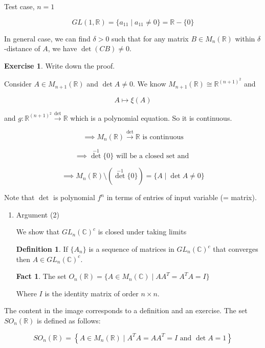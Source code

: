 \documentclass[11pt]{article}
\theoremstyle{definition}
\newtheorem{definition}{Definition}[section]
\newtheorem{fact}{Fact}
\newtheorem{exercise}{Exercise}
\theoremstyle{remark}
\begin{document}
Test case, $n=1$

\[
GL(1,\mathbb{R}) = \{a_{11} \mid a_{11} \neq 0\} = \mathbb{R} - \{0\}
\]

In general case, we can find $\delta > 0$ such that for any matrix $B \in M_n(\mathbb{R})$ within $\delta$-distance of $A$, we have $\det(CB) \neq 0$.

\begin{exercise}
Write down the proof.
\end{exercise}

Consider $A \in M_{n+1}(\mathbb{R})$ and $\det A \neq 0$. We know $M_{n+1}(\mathbb{R}) \cong \mathbb{R}^{(n+1)^2}$ and

\[
A \mapsto \xi(A)
\]

and $g: \mathbb{R}^{(n+1)^2} \xrightarrow{\det} \mathbb{R}$ which is a polynomial equation. So it is continuous.

\[
\implies M_n(\mathbb{R}) \xrightarrow{\det} \mathbb{R} \text{ is continuous}
\]

\[
\implies \det^{-1}\{0\} \text{ will be a closed set and }
\]

\[
\implies M_n(\mathbb{R}) \setminus (\det^{-1}\{0\}) = \{A \mid \det A \neq 0\}
\]

Note that $\det$ is polynomial $f^n$ in terms of entries of input variable (= matrix).

\begin{enumerate}
    \item Argument (2)

    We show that $GL_n(\mathbb{C})^c$ is closed under taking limits

    \begin{definition}\label{def:gln_limit}
        If $\{A_n\}$ is a sequence of matrices in $GL_n(\mathbb{C})^c$ that converges then $A \in GL_n(\mathbb{C})^c$.
    \end{definition}

    \begin{fact}\label{fact:orthogonal_group}
        The set $O_n(\mathbb{R}) = \{A \in M_n(\mathbb{C}) \mid AA^T = A^TA = I\}$
    \end{fact}
    Where $I$ is the identity matrix of order $n \times n$.
\end{enumerate}

The content in the image corresponds to a definition and an exercise.
The set $SO_n(\mathbb{R})$ is defined as follows:

\[
SO_n(\mathbb{R}) = \left\{ A \in M_n(\mathbb{R}) \mid A^T A = AA^T = I \text{ and } \det A = 1 \right\}
\]
\end{document}
